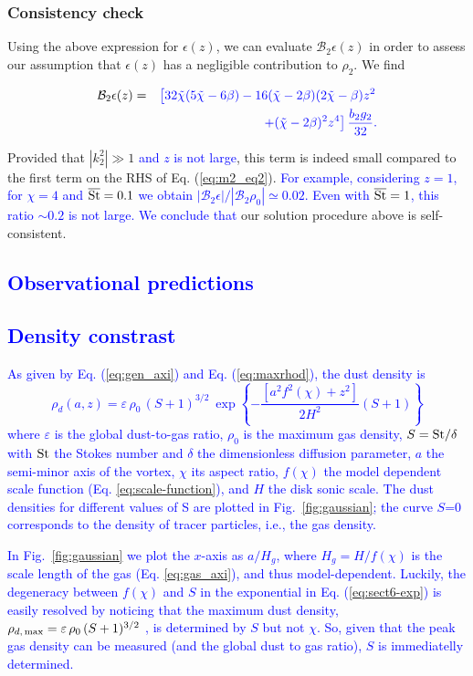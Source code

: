 \documentclass[apj]{emulateapj}
\def\blue#1{\textcolor{blue}{#1}}
\newcommand{\Eq}[1]{Eq. (\ref{#1})}
\newcommand{\eq}[1]{\Eq{#1}}
\newcommand{\eqp}[1]{(Eq. \ref{#1})}
\newcommand{\Fig}[1]{Fig.~\ref{#1}}
\newcommand{\fig}[1]{\Fig{#1}}
\newcommand{\beq}{\begin{equation}}
\newcommand{\eeq}{\end{equation}}
\newcommand{\beqn}{\begin{eqnarray}}
\newcommand{\eeqn}{\end{eqnarray}}
\newcommand{\tilchi}{\tilde\chi}
\newcommand{\St}{{\rm St}}
\begin{document}
\subsubsection{Consistency check}
Using the above expression for $\epsilon(z)$, we can evaluate
$\mathcal{B}_2\epsilon(z)$ in order to assess our assumption that
$\epsilon(z)$ has a negligible contribution to $\rho_2$. We find

\beqn
\mathcal{B}_2\epsilon(z) =&& \blue{\left[32\tilchi(5\tilchi - 6\beta)-16(\tilchi-2\beta)(2\tilchi-\beta)z^2
\right.\notag}\\&&\blue{\left.+(\tilchi - 2\beta)^2z^4\right]\frac{b_2g_2}{32}.}
\eeqn

Provided that $|k_2^2|\gg1$ \blue{and $z$ is not large},  
this term is indeed small compared to the first term on the RHS of \eq{eq:m2_eq2}.  \blue{For example, considering $z=1$, 
for $\chi=4$ and $\overline{\St}=0.1$ we obtain $|\mathcal{B}_2\epsilon|/|\mathcal{B}_2\rho_0|\simeq0.02$. 
Even with $\overline{\St}=1$, this ratio $\sim0.2$ is not large. We
conclude that}  our solution procedure above is self-consistent.

\blue{\section{Observational predictions}}

\blue{\subsection{Density constrast}}

\blue{As given by \eq{eq:gen_axi} and \eq{eq:maxrhod}, the dust density is 
\beq
   \rho_d(a,z) = \varepsilon \, \rho_0 \, (S+1)^{3/2} \  \exp{\left\{-\frac{\left[a^2f^2(\chi) + z^2\right]}{2H^2}(S+1)\right\}} 
\label{eq:sect6-exp}
\eeq where $\varepsilon$ is the global dust-to-gas ratio, $\rho_0$ is the
maximum gas density, $S=\St/\delta$ with $\St$ the Stokes number and $\delta$
the dimensionless diffusion parameter, $a$ the semi-minor axis of the
vortex, $\chi$ its aspect ratio, $f(\chi)$ the model dependent scale
function \eqp{eq:scale-function}, and $H$ the disk sonic scale. The
dust densities for different values of S are plotted in
\fig{fig:gaussian}; the curve $S$=0 corresponds to the density of tracer
particles, i.e., the gas density.} 

\blue{In \fig{fig:gaussian} we plot the $x$-axis as $a/H_g$, where
$H_g=H/f(\chi)$ is the scale length of the gas \eqp{eq:gas_axi}, 
and thus model-dependent. Luckily, the degeneracy between $f(\chi)$ and $S$ in
the exponential in \eq{eq:sect6-exp} is easily resolved by noticing
that the maximum dust density, $\rho_{d,\,{\rm max}} = \varepsilon \,
\rho_0 \, (S+1)^{3/2}$ , is determined by $S$ but not $\chi$. So, given that
the peak gas density can be measured (and the global dust to gas
ratio), $S$ is immediatelly determined.}
\end{document}

